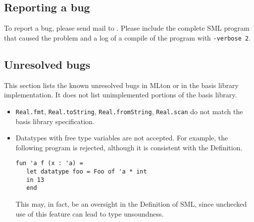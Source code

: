 
\subsection{Reporting a bug}

To report a bug, please send mail to {\mltonmail}.  Please include the
complete SML program that caused the problem and a log of a compile of
the program with {\tt -verbose 2}.

\subsection{Unresolved bugs}

This section lists the known unresolved bugs in MLton or in the basis
library implementation.  It does not list unimplemented portions of
the basis library.

\begin{itemize}

\item
{\tt Real.fmt}, {\tt Real.toString}, {\tt Real.fromString},
{\tt Real.scan}
do not match the basis library specification.

\item
Datatypes with free type variables are not accepted.  For example,
the following program is rejected, although it is consistent with the
Definition.
\begin{verbatim}
fun 'a f (x : 'a) =
   let datatype foo = Foo of 'a * int
   in 13
   end
\end{verbatim}
This may, in fact, be an oversight in the Definition of SML, since
unchecked use of this feature can lead to type unsoundness.

\end{itemize}
